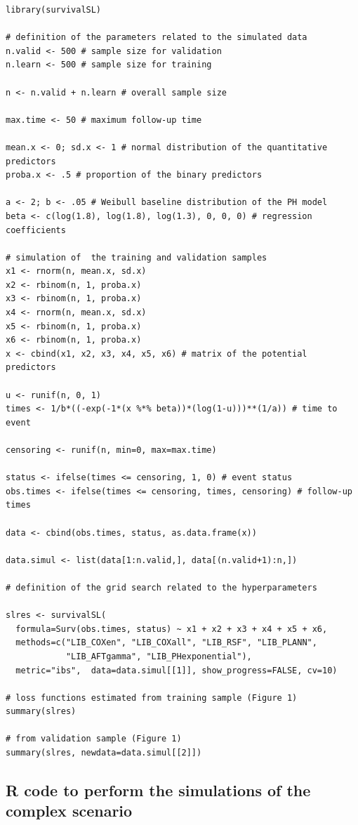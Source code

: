 \begin{verbatim}
library(survivalSL)

# definition of the parameters related to the simulated data
n.valid <- 500 # sample size for validation
n.learn <- 500 # sample size for training

n <- n.valid + n.learn # overall sample size

max.time <- 50 # maximum follow-up time

mean.x <- 0; sd.x <- 1 # normal distribution of the quantitative predictors
proba.x <- .5 # proportion of the binary predictors

a <- 2; b <- .05 # Weibull baseline distribution of the PH model
beta <- c(log(1.8), log(1.8), log(1.3), 0, 0, 0) # regression coefficients

# simulation of  the training and validation samples
x1 <- rnorm(n, mean.x, sd.x)
x2 <- rbinom(n, 1, proba.x)
x3 <- rbinom(n, 1, proba.x)
x4 <- rnorm(n, mean.x, sd.x)
x5 <- rbinom(n, 1, proba.x)
x6 <- rbinom(n, 1, proba.x)
x <- cbind(x1, x2, x3, x4, x5, x6) # matrix of the potential predictors
  
u <- runif(n, 0, 1)
times <- 1/b*((-exp(-1*(x %*% beta))*(log(1-u)))**(1/a)) # time to event
  
censoring <- runif(n, min=0, max=max.time)
  
status <- ifelse(times <= censoring, 1, 0) # event status
obs.times <- ifelse(times <= censoring, times, censoring) # follow-up times
  
data <- cbind(obs.times, status, as.data.frame(x))
  
data.simul <- list(data[1:n.valid,], data[(n.valid+1):n,])

# definition of the grid search related to the hyperparameters

slres <- survivalSL(
  formula=Surv(obs.times, status) ~ x1 + x2 + x3 + x4 + x5 + x6,
  methods=c("LIB_COXen", "LIB_COXall", "LIB_RSF", "LIB_PLANN",
            "LIB_AFTgamma", "LIB_PHexponential"),
  metric="ibs",  data=data.simul[[1]], show_progress=FALSE, cv=10)

# loss functions estimated from training sample (Figure 1)
summary(slres) 

# from validation sample (Figure 1)
summary(slres, newdata=data.simul[[2]]) 
\end{verbatim}

\newpage

\hypertarget{r-code-to-perform-the-simulations-of-the-complex-scenario}{%
\subsection{R code to perform the simulations of the complex scenario}\label{r-code-to-perform-the-simulations-of-the-complex-scenario}}

